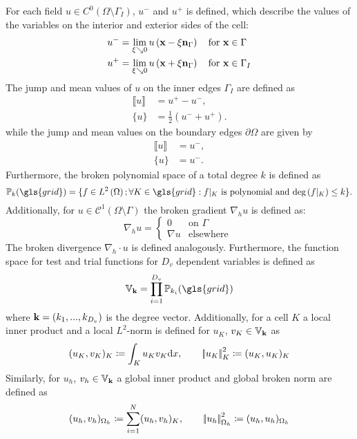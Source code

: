 For each field ${u} \in C^0\left(\Omega\setminus \Gamma_I\right)$, ${u}^-$  and ${u}^+$ is defined, which describe the values of the variables on the interior and exterior sides of the cell:
\begin{align}
	{u}^- & = \lim_{\xi \searrow 0} {u}\left(\textbf{x} - \xi \textbf{n}_{\Gamma}\right) \quad \text{for } \textbf{x}\in \Gamma   \\
	{u}^+ & = \lim_{\xi \searrow 0} {u}\left(\textbf{x} + \xi \textbf{n}_{\Gamma}\right) \quad \text{for } \textbf{x}\in \Gamma_I
\end{align}
The jump and mean values of ${u}$ on the inner edges $\Gamma_I$ are defined as
\begin{align}
	\llbracket {u} \rrbracket & = {u}^+-{u}^-,                           \\
	\{{u}\}                   & = \frac{1}{2} \left({u}^-+{u}^+\right).
\end{align}
while the jump and mean values on the boundary edges $\partial \Omega$ are given by
\begin{align}
	\llbracket {u} \rrbracket & = {u}^-,  \\
	\{{u}\}                   & = {u}^-.
\end{align}
Furthermore, the broken polynomial space of a total degree $k$ is defined as
\begin{equation}
	\mathbb{P}_k(\gls{grid} )= \{f \in L^2\left(\Omega\right); \forall K \in \gls{grid} : f\vert_{K} \text{ is polynomial and deg}\left(f\vert_{K}\right)\leq k \}.
	\label{Eq:PolSpace}
\end{equation}
Additionally, for $u \in \mathcal{C}^1(\Omega \setminus \Gamma)$ the broken gradient $\nabla_h u$ is defined as:
\begin{equation}
	\nabla_h u
	= \begin{cases}
		0
		 & \text{on }\Gamma  \\
		\nabla u
		 & \text{elsewhere }
	\end{cases}
\end{equation}
The broken divergence $\nabla_h \cdot u$ is defined analogously. Furthermore, the function space for test and trial functions for $D_v$ dependent variables is defined as
\begin{equation}
	\mathbb{V}_\myvector{k} = \prod_{i=1}^{D_v} \mathbb{P}_{k_i}(\gls{grid})
	\label{Eq:Vspace}
\end{equation}
where $\textbf{k} = \left(k_1,...,k_{D_v}\right)$ is the degree vector. 
Additionally, for a cell $K$  a local inner product and a local $L^2$-norm is defined for $u_K$, $v_K\in \mathbb{V}_{\textbf{k}}$ as
\begin{equation}
(u_K, v_K)_K \coloneqq \int_K u_K v_K\text{d}x, \qquad \left|\!\left| {u_K} \right|\!\right|^2_K \coloneqq(u_K,u_K)_K
\end{equation}
Similarly, for $u_h$, $v_h \in \mathbb{V}_{\textbf{k}}$ a global inner product and global broken norm are defined as
\begin{equation}
	(u_h, v_h)_{\Omega_h} \coloneqq \sum_{i = 1}^N (u_h, v_h)_K, \qquad \left|\!\left| {u_h} \right|\!\right|^2_{\Omega_h} \coloneqq(u_h,u_h)_{\Omega_h}
\end{equation}
